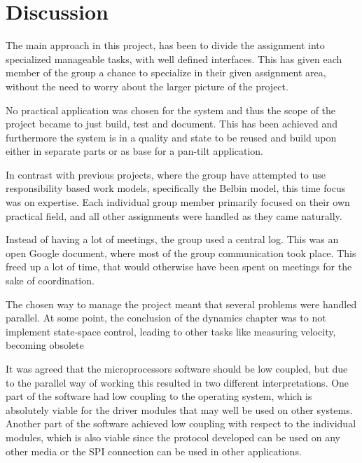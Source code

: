 \chapter{Discussion}\label{chap:discussion}

The main approach in this project, has been to divide the assignment into specialized manageable tasks, with well defined interfaces.  This has given each member of the group a chance to specialize in their given assignment area, without the need to worry about the larger picture of the project.



No practical application was chosen for the system and thus the scope of the project became to just build, test and document. This has been achieved and furthermore the system is in a quality and state to be reused and build upon either in separate parts or as base for a pan-tilt application.



In contrast with previous projects, where the group have attempted to use responsibility based work models, specifically the Belbin model, this time focus was on expertise. Each individual group member primarily focused on their own practical field, and all other assignments were handled as they came naturally. 



Instead of having a lot of meetings, the group used a central log. This was an open Google document, where most of the  group communication took place. This freed up a lot of time, that would otherwise have been spent on meetings for the sake of coordination. 



The chosen way to manage the project meant that several problems were handled parallel. At some point, the conclusion of the dynamics chapter was to not implement state-space control, leading to other tasks like measuring velocity, becoming obsolete



It was agreed that the microprocessors software should be low coupled, but due to the parallel way of working this resulted in two different interpretations. One part of the software had low coupling to the operating system, which is absolutely viable for the driver modules that may well be used on other systems. Another part of the software achieved low coupling with respect to the individual modules, which is also viable since the protocol developed can be used on any other media or the SPI connection can be used in other applications.



